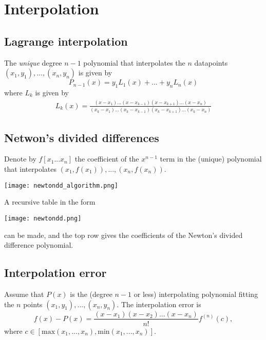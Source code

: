 \section{Interpolation}
\subsection{Lagrange interpolation}
The \textit{unique} degree $n-1$ polynomial that interpolates the $n$ datapoints $(x_1, y_1), ..., (x_n, y_n)$ is given by
$$
P_{n-1}(x) = y_1L_1(x) + ... + y_nL_n(x)
$$
where $L_k$ is given by
\begin{gather*}
L_k(x) = \frac{(x-x_1)...(x-x_{k-1})(x-x_{k+1})...(x-x_n)}{(x_k-x_1)...(x_k - x_{k-1})(x_k - x_{k+1})...(x_k-x_n)}
\end{gather*}

\subsection{Netwon's divided differences}
\begin{definition}
Denote by $f[x_1...x_n]$ the coefficient of the $x^{n-1}$ term in the (unique) polynomial that interpolates $(x_1, f(x_1)), ..., (x_n,f(x_n))$.
\end{definition}

\begin{center}
\texttt{[image: newtondd\_algorithm.png]}
\end{center}

A recursive table in the form
\begin{center}
\texttt{[image: newtondd.png]}
\end{center}
can be made, and the top row gives the coefficients of the Newton's divided difference polynomial.

\subsection{Interpolation error}
\begin{theorem}
Assume that $P(x)$ is the (degree $n-1$ or less) interpolating polynomial fitting the $n$ points $(x_1,y_1),...,(x_n,y_n)$. The interpolation error is
$$
f(x)-P(x) = \frac{(x-x_1)(x-x_2)...(x-x_n)}{n!}f^{(n)}(c),
$$
where $c \in [\text{max}(x_1,...,x_n), \text{min}(x_1,...,x_n)]$.
\end{theorem}

